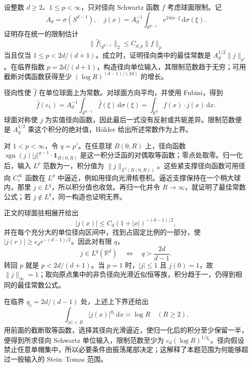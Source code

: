 \begin{exercise}\label{b2:ex:23-new-5}
设整数 \(d\geq2\)、\(1\leq p<\infty\)，只对径向 Schwartz 函数 \(f\) 考虑球面限制。记
\[
 A_d=\sigma(S^{d-1}),
 \quad j(x)=A_d^{-1}\int_{S^{d-1}}e^{2\pi\mathrm i x\cdot\xi}\,\mathrm d\sigma(\xi).
\]
证明存在统一的限制估计
\[
 \|\widehat f|_{S^{d-1}}\|_2\leq C_{d,p}\|f\|_p
\]
当且仅当 \(1\leq p<2d/(d+1)\)。成立时，证明径向类中的最佳常数是 \(A_d^{1/2}\|j\|_{p'}\)。在临界指数 \(p=2d/(d+1)\)，构造径向单位输入，其限制范数趋于无穷；可用截断对偶函数获得至少 \((\log R)^{(d-1)/(2d)}\) 的增长。
\end{exercise}
\begin{solution}
径向性使 \(\widehat f\) 在单位球面上为常数。对球面方向平均，并使用 Fubini，得到
\[
 \widehat f(e_1)=A_d^{-1}\int_{S^{d-1}}\widehat f(\xi)\,\mathrm d\sigma(\xi)
 =\int_{\mathbb R^d}f(x)\cdot j(x)\,\mathrm dx.
\]
球面对称使 \(j\) 为实值径向函数，因此最后一式没有反射或共轭差异。限制范数便是 \(A_d^{1/2}\) 乘这个积分的绝对值，Hölder 给出所述常数作为上界。

对 \(1<p<\infty\)，令 \(q=p'\)。在任意球 \(B(0,R)\) 上，径向函数
\(\operatorname{sgn}(j)|j|^{q-1}\cdot\mathbf1_{B(0,R)}\) 是这一积分泛函的对偶取等函数；零点处取零。归一化后，输入 \(L^p\) 范数为一，积分值为 \(\|j\|_{L^q(B(0,R))}\)。这些紧支撑径向函数可用径向 \(C_c^\infty\) 函数在 \(L^p\) 中逼近，例如用径向光滑核卷积。逼近支撑保持在一个稍大球内，那里 \(j\in L^q\)，所以积分值也收敛。再归一化并令 \(R\to\infty\)，就证明了最佳常数公式；若 \(j\notin L^q\)，同一构造也证明无界。

正文的球面驻相展开给出
\[
 |j(x)|\leq C_d(1+|x|)^{-(d-1)/2},
\]
并在每个充分大的单位径向区间中，找到占固定比例的一部分，使 \(|j(r)|\geq c_dr^{-(d-1)/2}\)。因此对有限 \(q\)，
\[
 j\in L^q(\mathbb R^d)
 \quad\Longleftrightarrow\quad q>\frac{2d}{d-1}.
\]
转回 \(p\) 就是 \(p<2d/(d+1)\)。当 \(p=1\) 时，\(|j|\leq1\) 且 \(j(0)=1\)，故 \(\|j\|_\infty=1\)；取向原点集中的非负径向光滑近似恒等族，积分趋于一，仍得到相同的最佳常数公式。

在临界 \(q_c=2d/(d-1)\) 处，上述上下界还给出
\[
 \int_{|x|<R}|j(x)|^{q_c}\,\mathrm dx\asymp\log R
 \quad(R\geq2).
\]
用前面的截断取等函数，选择其径向光滑逼近，使归一化后的积分至少保留一半，便得到所求径向 Schwartz 单位输入，限制范数至少为 \(c_d(\log R)^{1/q_c}\)。径向假设禁止任意单帽集中，所以必要条件由振荡尾部决定；这解释了本题范围为何能够超过一般输入的 Stein--Tomas 范围。
\end{solution}

